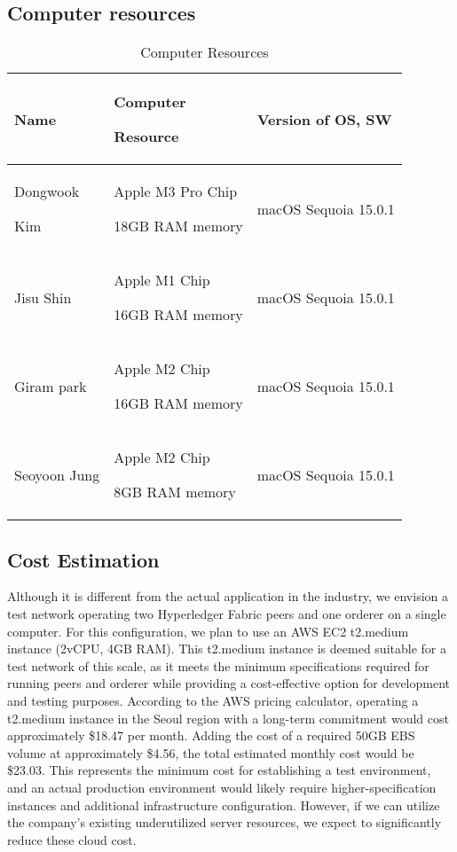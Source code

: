 \documentclass[conference]{IEEEtran}
\begin{document}
\vspace{4.5cm}

\subsection{Computer resources}

\begin{table}[h]
	\caption{Computer Resources}
	\def\arraystretch{1.4} \small
	\begin{tabular}{|p{1.8cm}|p{2.7cm}|p{3.1cm}|}
		\hline
		Name              & Computer \par Resource                 & Version of OS, SW    \\ \hline
		
		Dongwook \par Kim & Apple M3 Pro Chip \par 18GB RAM memory & macOS Sequoia 15.0.1 
		\\ \hline
		
		Jisu Shin         & Apple M1 Chip \par 16GB RAM memory     & macOS Sequoia 15.0.1 
		\\ \hline
		
		Giram park        & Apple M2 Chip \par 16GB RAM memory     & macOS Sequoia 15.0.1 
		\\ \hline
		
		Seoyoon Jung      & Apple M2 Chip \par 8GB RAM memory      & macOS Sequoia 15.0.1 
		\\ \hline
		
	\end{tabular}
\end{table}

\subsection{Cost Estimation}

Although it is different from the actual application in the industry, we envision a test network operating two Hyperledger Fabric peers and one orderer on a single computer. For this configuration, we plan to use an AWS EC2 t2.medium instance (2vCPU, 4GB RAM). This t2.medium instance is deemed suitable for a test network of this scale, as it meets the minimum specifications required for running peers and orderer while providing a cost-effective option for development and testing purposes. According to the AWS pricing calculator, operating a t2.medium instance in the Seoul region with a long-term commitment would cost approximately \$18.47 per month. Adding the cost of a required 50GB EBS volume at approximately \$4.56, the total estimated monthly cost would be \$23.03. This represents the minimum cost for establishing a test environment, and an actual production environment would likely require higher-specification instances and additional infrastructure configuration. However, if we can utilize the company's existing underutilized server resources, we expect to significantly reduce these cloud cost.
\end{document}
